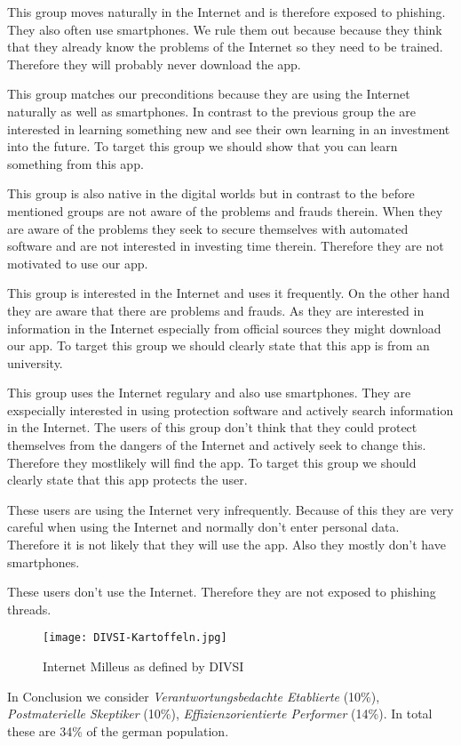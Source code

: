 \begin{description}[leftmargin=0cm]
\item[Digital Souver\"{a}ne] This group moves naturally in the Internet and is therefore exposed to phishing. They also often use smartphones. We rule them out because because they think that they already know the problems of the Internet so they need to be trained. Therefore they will probably never download the app.
\item[Effizienzorientierte Performer] This group matches our preconditions because they are using the Internet naturally as well as smartphones. In contrast to the previous group the are interested in learning something new and see their own learning in an investment into the future. To target this group we should show that you can learn something from this app.
\item[Unbek\"{u}mmerte Hedonisten] This group is also native in the digital worlds but in contrast to the before mentioned groups are not aware of the problems and frauds therein. When they are aware of the problems they seek to secure themselves with automated software and are not interested in investing time therein. Therefore they are not motivated to use our app.
\item[Postmaterielle Skeptiker] This group is interested in the Internet and uses it frequently. On the other hand they are aware that there are problems and frauds. As they are interested in information in the Internet especially from official sources they might download our app. To target this group we should clearly state that this app is from an university.
\item[Verantwortungsbedachte Etablierte] This group uses the Internet regulary and also use smartphones. They are exspecially interested in using protection software and actively search information in the Internet. The users of this group don't think that they could protect themselves from the dangers of the Internet and actively seek to change this. Therefore they mostlikely will find the app. To target this group we should clearly state that this app protects the user.
\item[Ordnungsfordernde Internet-Laien] These users are using the Internet very infrequently. Because of this they are very careful when using the Internet and normally don't enter personal data. Therefore it is not likely that they will use the app. Also they mostly don't have smartphones.
\item[Internetferne Verunsicherte] These users don't use the Internet. Therefore they are not exposed to phishing threads.
\end{description}

\begin{figure}[hHtbp]
\centering
\texttt{[image: DIVSI-Kartoffeln.jpg]}
\caption{Internet Milleus as defined by DIVSI}
\label{fig:divsi_kartoffeln}
\end{figure}

In Conclusion we consider \textit{Verantwortungsbedachte Etablierte} (10\%),  \textit{Postmaterielle Skeptiker} (10\%),  \textit{Effizienzorientierte Performer} (14\%). In total these are 34\% of the german population.
